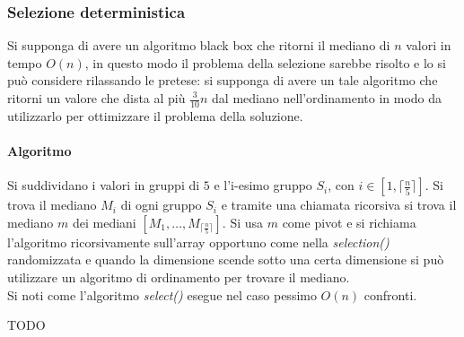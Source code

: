 \subsubsection{Selezione deterministica}
Si supponga di avere un algoritmo black box che ritorni il mediano di $n$ valori in tempo $O(n)$, in questo modo il problema della selezione sarebbe risolto e lo si pu\`o considere
rilassando le pretese: si supponga di avere un tale algoritmo che ritorni un valore che dista al pi\`u $\frac{3}{10}n$ dal mediano nell'ordinamento in modo da utilizzarlo per ottimizzare
il problema della soluzione.
\paragraph{Algoritmo}
Si suddividano i valori in gruppi di $5$ e l'i-esimo gruppo $S_i$, con $i\in[1, \bigl\lceil\frac{n}{5}\bigr\rceil]$. Si trova il mediano $M_i$ di ogni gruppo $S_i$ e tramite una chiamata
ricorsiva si trova il mediano $m$ dei mediani $[M_1, \dots, M_{\lceil\frac{n}{5}\rceil}]$. Si usa $m$ come pivot e si richiama l'algoritmo ricorsivamente sull'array opportuno come
nella \emph{selection()} randomizzata e quando la dimensione scende sotto una certa dimensione si pu\`o utilizzare un algoritmo di ordinamento per trovare il mediano.\\

Si noti come l'algoritmo \emph{select()} esegue nel caso pessimo $O(n)$ confronti. 
\begin{Huge}
	TODO
\end{Huge}
